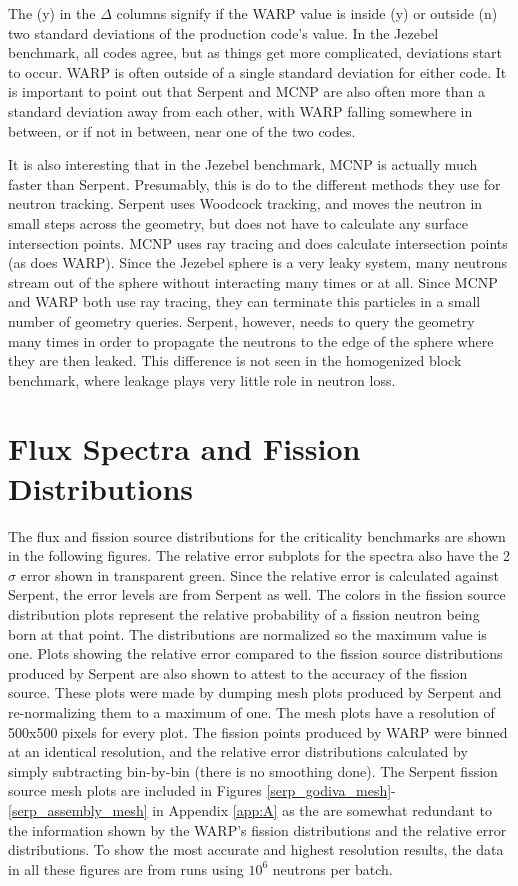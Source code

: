 The (y) in the $\Delta$ columns signify if the WARP value is inside (y) or outside (n) two standard deviations of the production code's value.  In the Jezebel benchmark, all codes agree, but as things get more complicated, deviations start to occur.  WARP is often outside of a single standard deviation for either code.  It is important to point out that Serpent and MCNP are also often more than a standard deviation away from each other, with WARP falling somewhere in between, or if not in between, near one of the two codes.

It is also interesting that in the Jezebel benchmark, MCNP is actually much faster than Serpent.  Presumably, this is do to the different methods they use for neutron tracking.  Serpent uses Woodcock tracking, and moves the neutron in small steps across the geometry, but does not have to calculate any surface intersection points.  MCNP uses ray tracing and does calculate intersection points (as does WARP).  Since the Jezebel sphere is a very leaky system, many neutrons stream out of the sphere without interacting many times or at all.  Since  MCNP and WARP both use ray tracing, they can terminate this particles in a small number of geometry queries.  Serpent, however, needs to query the geometry many times in order to propagate the neutrons to the edge of the sphere where they are then leaked.  This difference is not seen in the homogenized block benchmark, where leakage plays very little role in neutron loss.

\section{Flux Spectra and Fission Distributions}

The flux and fission source distributions for the criticality benchmarks are shown in the following figures.  The relative error subplots for the spectra also have the 2$\sigma$ error shown in transparent green.  Since the relative error is calculated against Serpent, the error levels are from Serpent as well.  The colors in the fission source distribution plots represent the relative probability of a fission neutron being born at that point.  The distributions are normalized so the maximum value is one.  Plots showing the relative error compared to the fission source distributions produced by Serpent are also shown to attest to the accuracy of the fission source.  These plots were made by dumping mesh plots produced by Serpent and re-normalizing them to a maximum of one.  The mesh plots have a resolution of 500x500 pixels for every plot.  The fission points produced by WARP were binned at an identical resolution, and the relative error distributions calculated by simply subtracting bin-by-bin (there is no smoothing done).  The Serpent fission source mesh plots are included in Figures \ref{serp_godiva_mesh}-\ref{serp_assembly_mesh} in Appendix \ref{app:A} as the are somewhat redundant to the information shown by the WARP's fission distributions and the relative error distributions.  To show the most accurate and highest resolution results, the data in all these figures are from runs using $10^6$ neutrons per batch.

